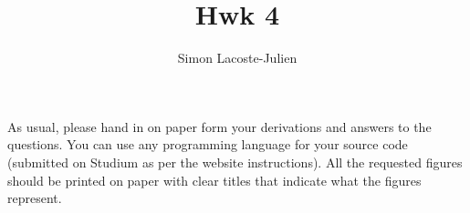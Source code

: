 \documentclass[12pt]{article}
\title{Hwk 4}
\author{Simon Lacoste-Julien}
\newcommand{\1}{{\bf 1}}
\begin{document}
\fancyhead{}
\fancyfoot{}



As usual, please hand in on paper form your derivations and answers to the questions. You can use any programming language for your source code (submitted on Studium as per the website instructions). All the requested figures should be printed on paper with clear titles that indicate what the figures represent.

\end{document}
